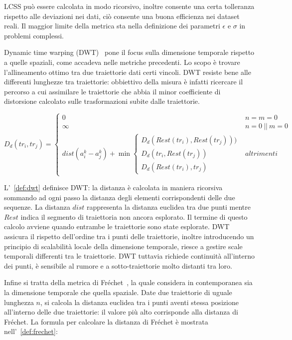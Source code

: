   
  LCSS può essere calcolata in modo ricorsivo, inoltre consente una certa tolleranza rispetto
  alle deviazioni nei dati, ciò consente una buona efficienza nei dataset reali.
  Il maggior limite della metrica sta nella definizione dei parametri
  \(\epsilon \) e \( \sigma \) in problemi complessi.

  Dynamic time warping (DWT)~\cite{chen2005robust} pone il focus sulla dimensione temporale rispetto a quelle spaziali, come accadeva nelle metriche precedenti.
  Lo scopo è trovare l'allineamento ottimo tra due traiettorie dati certi vincoli.
  DWT resiste bene alle differenti lunghezze tra traiettorie: obbiettivo della misura è infatti ricercare il percorso a cui assimilare le traiettorie che abbia il minor coefficiente di distorsione
  calcolato sulle trasformazioni subite dalle traiettorie.
  
    \begin{equation} \label{def:dwt}
     { D_{d}(tr_{i}, tr_{j}) =
        \begin{cases}
         0 & n = m = 0 \\
         \infty & n = 0~||~m = 0 \\
         dist(a_{i}^{k} - a_{j}^{k}) +
         \min{
         \begin{cases}
         D_{d}(Rest(tr_{i}), Rest(tr_{j}))) \\
         D_{d}(tr_{i}, Rest(tr_{j})) \\
         D_{d}(Rest(tr_{i}),tr_{j}) 
         \end{cases}
         } & altrimenti
      \end{cases}
      }
  \end{equation}
  
  L'~\cref{def:dwt} definisce DWT: la distanza è calcolata in maniera ricorsiva sommando ad ogni passo la distanza degli elementi corrispondenti delle due sequenze.
  La distanza \(dist\) rappresenta la distanza euclidea tra due punti mentre \(Rest\) indica il segmento di traiettoria non ancora esplorato.
  Il termine di questo calcolo avviene quando entrambe le traiettorie sono state esplorate.
  DWT assicura il rispetto dell'ordine tra i punti delle traiettorie, inoltre introducendo un principio di scalabilità locale della dimensione temporale,
  riesce a gestire scale temporali differenti tra le traiettorie.
  DWT tuttavia richiede continuità all'interno dei punti, è sensibile al rumore e a sotto-traiettorie molto distanti tra loro.

  Infine si tratta della
   metrica di Fréchet~\cite{khoshaein2013trajectory}, la quale considera in contemporanea sia la dimensione temporale
  che quella spaziale.
  Date due traiettorie di uguale lunghezza \(n\), si calcola la distanza euclidea tra i punti aventi stessa posizione all'interno delle due traiettorie:
  il valore più alto corrisponde alla distanza di Fréchet.
  La formula per calcolare la distanza di Fréchet 
  è mostrata nell'~\cref{def:frechet}:
  

